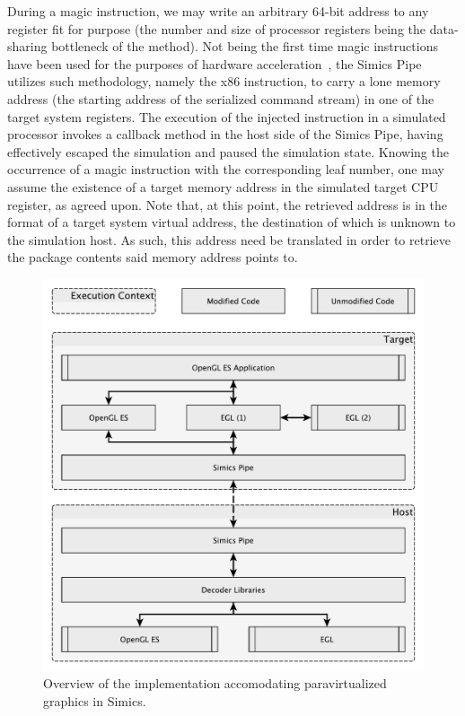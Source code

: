 During a magic instruction, we may write an arbitrary 64-bit address to any register fit for purpose (the number and size of processor registers being the data-sharing bottleneck of the method).
Not being the first time magic instructions have been used for the purposes of hardware acceleration~, the Simics Pipe utilizes such methodology, namely the  x86 instruction, to carry a lone memory address (the starting address of the serialized command stream) in one of the target system registers.
The execution of the injected instruction in a simulated processor invokes a callback method in the host side of the Simics Pipe, having effectively escaped the simulation and paused the simulation state.
Knowing the occurrence of a magic instruction with the corresponding leaf number, one may assume the existence of a target memory address in the simulated target CPU register, as agreed upon.
Note that, at this point, the retrieved address is in the format of a target system virtual address, the destination of which is unknown to the simulation host.
As such, this address need be translated in order to retrieve the package contents said memory address points to.

\begin{figure}
\centering
\includegraphics[width=\linewidth]{img/yedoverview.pdf}
\caption[Paravirtualization implementation overview]{Overview of the implementation accomodating paravirtualized graphics in Simics.}
\label{fig:overview}
\end{figure}

